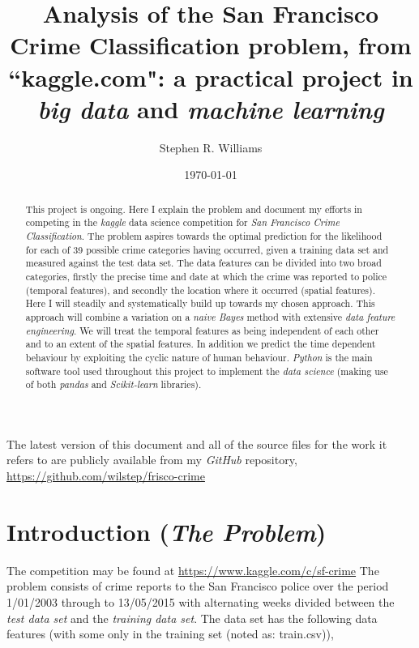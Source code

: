 \documentclass[12pt,notitlepage]{article}
\title{Analysis of the San Francisco Crime Classification problem, from ``kaggle.com": a practical project in \emph{big data} and \emph{machine learning}}
\author{Stephen R. Williams}
\date{\today}  %
\begin{document}
\maketitle

\begin{abstract}
This project is ongoing. Here I explain the problem and document my efforts in competing in the \emph{kaggle} data science competition for \emph{San Francisco Crime Classification}. The problem aspires towards the optimal prediction for the likelihood for each of 39 possible crime categories having occurred, given a training data set and measured against the test data set. The data features can be divided into two broad categories, firstly the precise time and date at which the crime was reported to police (temporal features), and secondly the location where it occurred (spatial features). Here I will steadily and systematically build up towards my chosen approach. This approach will combine a variation on a \emph{naive Bayes} method with extensive \emph{data feature engineering}. We will treat the temporal features as being independent of each other and to an extent of the spatial features. In addition we predict the time dependent behaviour by exploiting the cyclic nature of human behaviour. \emph{Python} is the main software tool used throughout this project to implement the \emph{data science} (making use of both \emph{pandas} and \emph{Scikit-learn} libraries).
\end{abstract}

The latest version of this document and all of the source files for the work it refers to are publicly available from my \emph{GitHub} repository, \url{https://github.com/wilstep/frisco-crime}

\section{Introduction (\emph{The Problem})}

The competition may be found at \url{https://www.kaggle.com/c/sf-crime} The problem consists of crime reports to the San Francisco police over the period 1/01/2003 through to 13/05/2015 with alternating weeks divided between the \emph{test data set} and the \emph{training data set}. The data set has the following data features (with some only in the training set (noted as: train.csv)),
 
\end{document}
